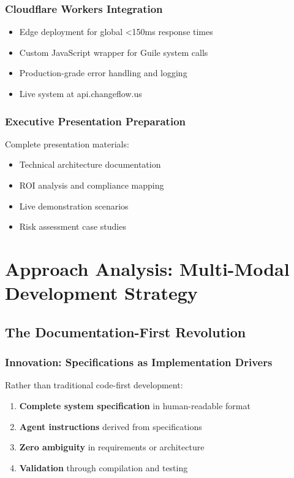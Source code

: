 \documentclass[11pt]{article}
\begin{document}
\subsubsection{Cloudflare Workers Integration}
\label{sec:orgfe5a4be}
\begin{itemize}
\item Edge deployment for global <150ms response times
\item Custom JavaScript wrapper for Guile system calls
\item Production-grade error handling and logging
\item Live system at api.changeflow.us
\end{itemize}
\subsubsection{Executive Presentation Preparation}
\label{sec:org5277e60}
Complete presentation materials:
\begin{itemize}
\item Technical architecture documentation
\item ROI analysis and compliance mapping
\item Live demonstration scenarios
\item Risk assessment case studies
\end{itemize}
\section{Approach Analysis: Multi-Modal Development Strategy}
\label{sec:org8ac3cf4}

\subsection{The Documentation-First Revolution}
\label{sec:orgda1229c}
\subsubsection{Innovation: Specifications as Implementation Drivers}
\label{sec:orgdf37a09}
Rather than traditional code-first development:
\begin{enumerate}
\item \textbf{\textbf{Complete system specification}} in human-readable format
\item \textbf{\textbf{Agent instructions}} derived from specifications
\item \textbf{\textbf{Zero ambiguity}} in requirements or architecture
\item \textbf{\textbf{Validation}} through compilation and testing
\end{enumerate}
\end{document}
